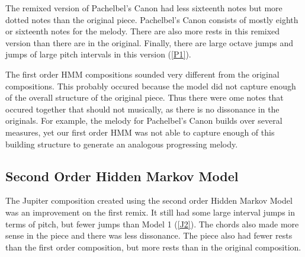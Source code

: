\documentclass{article} %
\begin{document}
The remixed version of Pachelbel's Canon had less sixteenth notes but more dotted notes than the original piece. Pachelbel's Canon consists of mostly eighth or sixteenth notes for the melody. There are also more rests in this remixed version than there are in the original. Finally, there are large octave jumps and jumps of large pitch intervals in this version (\autoref{P1}).

The first order HMM compositions sounded very different from the original compositions. This probably occured because the model did not capture enough of the overall structure of the original piece. Thus there  were ome notes that occured together that should not musically, as there is no dissonance in the originals. For example, the melody for Pachelbel's Canon builds over several measures, yet our first order HMM was not able to capture enough of this building structure to generate an analogous progressing melody. 


\subsection{Second Order Hidden Markov Model}

The Jupiter composition created using the second order Hidden Markov Model was an improvement on the first remix. It still had some large interval jumps in terms of pitch, but fewer jumps than Model 1 (\autoref{J2}). The chords also made more sense in the piece and there was less dissonance. The piece also had fewer rests than the first order composition, but more rests than in the original composition.
\end{document}
